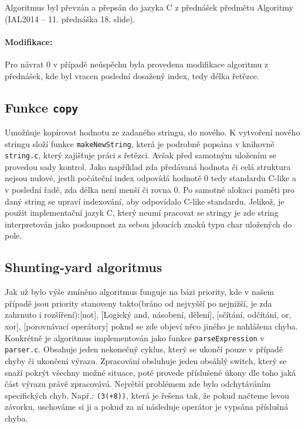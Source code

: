 \documentclass[12pt,a4paper,titlepage,final]{article}
\begin{document}
Algoritmus byl převzán a přepsán do jazyka C z přednášek předmětu Algoritmy (IAL2014
\cite{honzik2} -- 11. přednáška 18. slide).
 
\paragraph{Modifikace:} Pro návrat 0 v případě neúspěchu byla provedena modifikace
algoritmu z přednášek, kde byl vracen poslední dosažený index, tedy délka řetězce.

\subsection{Funkce \texttt{copy}}
Umožňuje kopírovat hodnotu ze zadaného stringu, do nového. K vytvoření nového stringu složí funkce \verb|makeNewString|, která je podrobně popsána v knihovně \verb|string.c|, který zajišťuje práci s řetězci. Avšak před samotným uložením se provedou sady kontrol. Jako například zda předávaná hodnota či celá struktura nejsou nulové, jestli počáteční index odpovídá hodnotě 0 tedy standardu C-like a v poslední řadě, zda délka není menší či rovna 0. Po samotné alokaci paměti pro daný string se upraví indexování, aby odpovídalo C-like standardu. Jelikož, je použit implementační jazyk C, který neumí pracovat se stringy je zde string interpretován jako posloupnost za sebou jdoucích znaků typu char uložených do pole.

\subsection{Shunting-yard algoritmus}\label{sya_popis}
Jak už bylo výše zmíněno algoritmus funguje na bázi priority, kde v našem případě jsou priority stanoveny takto(bráno od nejvyšší po nejnižší, je zda zahrnuto i rozšíření):[not], [Logický and, násobení, dělení], [sčítání, odčítání, or, xor], [porovnávací operátory] pokud se zde objeví něco jiného je nahlášena chyba. Konkrétně je algoritmus implementován jako funkce \verb|parseExpression| v \verb|parser.c|. Obsahuje jeden nekonečný cyklus, který se ukončí pouze v případě chyby či ukončení výrazu. Zpracování obsluhuje jeden obsáhlý switch, který se snaží pokrýt všechny možné situace, poté provede příslušené úkony dle toho jaká část výrazu právě zpracovává. Největší problémem zde bylo odchytáváním specifických chyb. Např.: \verb|(3(+8))|, která je řešena tak, že pokud načteme levou závorku, uschováme si ji a pokud za ní následuje operátor je vypsána příslušná chyba.
\end{document}
